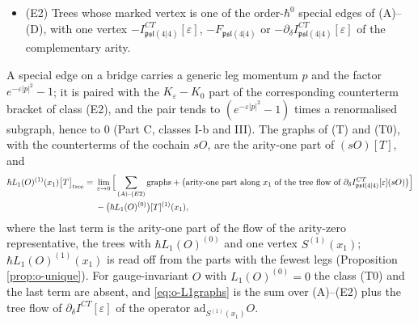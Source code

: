 \begin{theorem}
\begin{itemize}
\item (E2) Trees whose marked vertex is one of the order-$\hbar^0$ special edges of (A)--(D), with one vertex $-I^{CT}_{\mathfrak{psl}(4|4)}[\varepsilon]$, $-F_{\mathfrak{psl}(4|4)}$ or $-\partial_\delta I^{CT}_{\mathfrak{psl}(4|4)}[\varepsilon]$ of the complementary arity.
\end{itemize}
A special edge on a bridge carries a generic leg momentum $p$ and the factor $e^{-\varepsilon|p|^2}-1$; it is paired with the $K_\varepsilon-K_0$ part of the corresponding counterterm bracket of class (E2), and the pair tends to $(e^{-\varepsilon|p|^2}-1)$ times a renormalised subgraph, hence to $0$ (Part C, classes I-b and III). The graphs of (T) and (T0), with the counterterms of the cochain $sO$, are the arity-one part of $(sO)[T]$, and
\begin{equation}
\begin{aligned}
\hbar L_1(O)^{(1)}(x_1)\big[T\big]_{\rm tree}={}&\lim_{\varepsilon\to0}\Big[\sum_{(A)\text{--}(E2)}\text{graphs}+\big(\text{arity-one part along }x_1\text{ of the tree flow of }\partial_\delta I^{CT}_{\mathfrak{psl}(4|4)}[\varepsilon](sO)\big)\Big]\\
&-\big(\hbar L_1(O)^{(0)}\big)[T]^{(1)}(x_1),
\end{aligned}
\label{eq:o-L1graphs}
\end{equation}
where the last term is the arity-one part of the flow of the arity-zero representative, the trees with $\hbar L_1(O)^{(0)}$ and one vertex $S^{(1)}(x_1)$; $\hbar L_1(O)^{(1)}(x_1)$ is read off from the parts with the fewest legs (Proposition \ref{prop:o-unique}). For gauge-invariant $O$ with $L_1(O)^{(0)}=0$ the class (T0) and the last term are absent, and \eqref{eq:o-L1graphs} is the sum over (A)--(E2) plus the tree flow of $\partial_\delta I^{CT}[\varepsilon]$ of the operator $\mathrm{ad}_{S^{(1)}(x_1)}O$.
\end{theorem}

